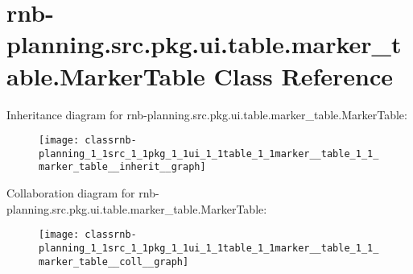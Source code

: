 \hypertarget{classrnb-planning_1_1src_1_1pkg_1_1ui_1_1table_1_1marker__table_1_1_marker_table}{}\section{rnb-\/planning.src.\+pkg.\+ui.\+table.\+marker\+\_\+table.\+Marker\+Table Class Reference}
\label{classrnb-planning_1_1src_1_1pkg_1_1ui_1_1table_1_1marker__table_1_1_marker_table}


Inheritance diagram for rnb-\/planning.src.\+pkg.\+ui.\+table.\+marker\+\_\+table.\+Marker\+Table\+:
\nopagebreak
\begin{figure}[H]
\begin{center}
\leavevmode
\texttt{[image: classrnb-planning\_1\_1src\_1\_1pkg\_1\_1ui\_1\_1table\_1\_1marker\_\_table\_1\_1\_marker\_table\_\_inherit\_\_graph]}
\end{center}
\end{figure}


Collaboration diagram for rnb-\/planning.src.\+pkg.\+ui.\+table.\+marker\+\_\+table.\+Marker\+Table\+:
\nopagebreak
\begin{figure}[H]
\begin{center}
\leavevmode
\texttt{[image: classrnb-planning\_1\_1src\_1\_1pkg\_1\_1ui\_1\_1table\_1\_1marker\_\_table\_1\_1\_marker\_table\_\_coll\_\_graph]}
\end{center}
\end{figure}
